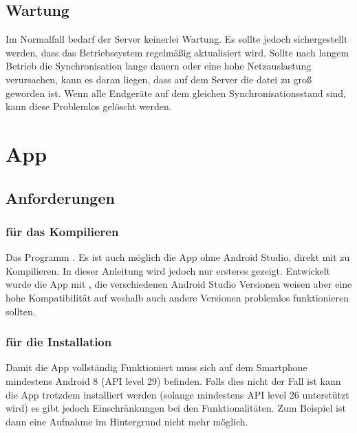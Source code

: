 \documentclass{article}
\begin{document}
\subsection{Wartung}
Im Normalfall bedarf der Server keinerlei Wartung. 
Es sollte jedoch sichergestellt werden, dass das Betriebssystem regelmäßig aktualisiert
wird. Sollte nach langem Betrieb die Synchronisation lange dauern oder eine 
hohe Netzauslastung verursachen, kann es daran liegen, dass auf dem Server
die datei  zu groß geworden ist. Wenn alle Endgeräte auf dem 
gleichen Synchronisationsstand sind, kann diese Problemlos gelöscht werden.
\section{App}
\subsection{Anforderungen}
\subsubsection{für das Kompilieren}
Das Programm . Es ist auch möglich die App ohne Android Studio, direkt mit  zu Kompilieren.
In dieser Anleitung wird jedoch nur ersteres gezeigt. Entwickelt wurde die App mit , die
verschiedenen Android Studio Versionen weisen aber eine hohe Kompatibilität auf weshalb auch andere Versionen
problemlos funktionieren sollten.
\subsubsection{für die Installation}
Damit die App vollständig Funktioniert muss sich auf dem Smartphone mindestens Android 8 (API level 29) befinden.
Falls dies nicht der Fall ist kann die App trotzdem installiert werden (solange mindestens API level 26 unterstützt wird)
es gibt jedoch Einschränkungen bei den Funktionalitäten. Zum Beispiel ist dann eine Aufnahme im Hintergrund nicht mehr
möglich.
\end{document}
